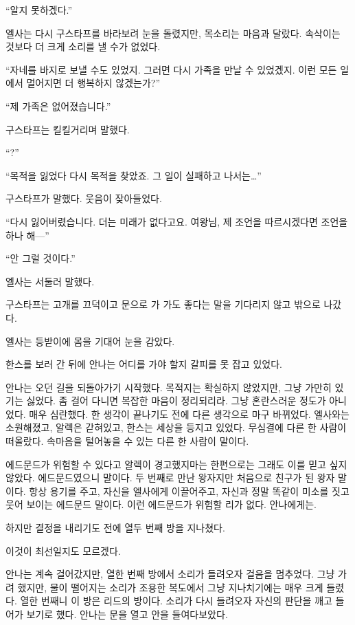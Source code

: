 ``알지 못하겠다.''

엘사는 다시 구스타프를 바라보려 눈을 돌렸지만, 목소리는 마음과 달랐다. 속삭이는 것보다 더 크게 소리를 낼 수가 없었다.

``자네를 바지로 보낼 수도 있었지. 그러면 다시 가족을 만날 수 있었겠지. 이런 모든 일에서 멀어지면 더 행복하지 않겠는가?''

``제 가족은 없어졌습니다.''

구스타프는 킬킬거리며 말했다.

``?''

``목적을 잃었다 다시 목적을 찾았죠. 그 일이 실패하고 나서는\ldots''

구스타프가 말했다. 웃음이 잦아들었다.

``다시 잃어버렸습니다. 더는 미래가 없다고요. 여왕님, 제 조언을 따르시겠다면 조언을 하나 해—''

``안 그럴 것이다.''

엘사는 서둘러 말했다.

구스타프는 고개를 끄덕이고 문으로 가 가도 좋다는 말을 기다리지 않고 밖으로 나갔다.

엘사는 등받이에 몸을 기대어 눈을 감았다.

\textbreak

한스를 보러 간 뒤에 안나는 어디를 가야 할지 갈피를 못 잡고 있었다.

안나는 오던 길을 되돌아가기 시작했다. 목적지는 확실하지 않았지만, 그냥 가만히 있기는 싫었다. 좀 걸어 다니면 복잡한 마음이 정리되리라. 그냥 혼란스러운 정도가 아니었다. 매우 심란했다. 한 생각이 끝나기도 전에 다른 생각으로 마구 바뀌었다. 엘사와는 소원해졌고, 알렉은 갇혀있고, 한스는 세상을 등지고 있었다. 무심결에 다른 한 사람이 떠올랐다. 속마음을 털어놓을 수 있는 다른 한 사람이 말이다.

에드문드가 위험할 수 있다고 알렉이 경고했지마는 한편으로는 그래도 이를 믿고 싶지 않았다. 에드문드였으니 말이다. 두 번째로 만난 왕자지만 처음으로 친구가 된 왕자 말이다. 항상 용기를 주고, 자신을 엘사에게 이끌어주고, 자신과 정말 똑같이 미소를 짓고 웃어 보이는 에드문드 말이다. 이런 에드문드가 위험할 리가 없다. 안나에게는.

하지만 결정을 내리기도 전에 열두 번째 방을 지나쳤다.

이것이 최선일지도 모르겠다.

안나는 계속 걸어갔지만, 열한 번째 방에서 소리가 들려오자 걸음을 멈추었다. 그냥 가려 했지만, 물이 떨어지는 소리가 조용한 복도에서 그냥 지나치기에는 매우 크게 들렸다. 열한 번째니 이 방은 리드의 방이다. 소리가 다시 들려오자 자신의 판단을 깨고 들어가 보기로 했다. 안나는 문을 열고 안을 들여다보았다.

